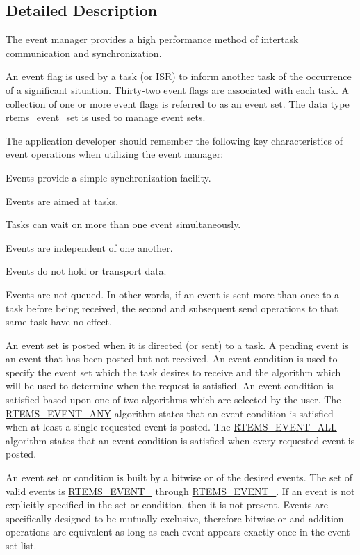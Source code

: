 \subsection{Detailed Description}
The event manager provides a high performance method of intertask communication and synchronization. 

An event flag is used by a task (or I\+SR) to inform another task of the occurrence of a significant situation. Thirty-\/two event flags are associated with each task. A collection of one or more event flags is referred to as an event set. The data type rtems\+\_\+event\+\_\+set is used to manage event sets.

The application developer should remember the following key characteristics of event operations when utilizing the event manager\+:


\begin{DoxyItemize}
\item Events provide a simple synchronization facility.
\item Events are aimed at tasks.
\item Tasks can wait on more than one event simultaneously.
\item Events are independent of one another.
\item Events do not hold or transport data.
\item Events are not queued. In other words, if an event is sent more than once to a task before being received, the second and subsequent send operations to that same task have no effect.
\end{DoxyItemize}

An event set is posted when it is directed (or sent) to a task. A pending event is an event that has been posted but not received. An event condition is used to specify the event set which the task desires to receive and the algorithm which will be used to determine when the request is satisfied. An event condition is satisfied based upon one of two algorithms which are selected by the user. The \mbox{\hyperlink{group__ClassicOptions_ga164c17066d5d7f90e8626bfc0f6b6249}{R\+T\+E\+M\+S\+\_\+\+E\+V\+E\+N\+T\+\_\+\+A\+NY}} algorithm states that an event condition is satisfied when at least a single requested event is posted. The \mbox{\hyperlink{group__ClassicOptions_gafe88e8efae3e200e7fec8bd894dc09ec}{R\+T\+E\+M\+S\+\_\+\+E\+V\+E\+N\+T\+\_\+\+A\+LL}} algorithm states that an event condition is satisfied when every requested event is posted.

An event set or condition is built by a bitwise or of the desired events. The set of valid events is \mbox{\hyperlink{group__ClassicEventSet_ga40310258a3cbe2bef8420158c59f6acc}{R\+T\+E\+M\+S\+\_\+\+E\+V\+E\+N\+T\+\_}} through \mbox{\hyperlink{group__ClassicEventSet_gac9fdddefb1a966354c315634c2390b66}{R\+T\+E\+M\+S\+\_\+\+E\+V\+E\+N\+T\+\_}}. If an event is not explicitly specified in the set or condition, then it is not present. Events are specifically designed to be mutually exclusive, therefore bitwise or and addition operations are equivalent as long as each event appears exactly once in the event set list.


